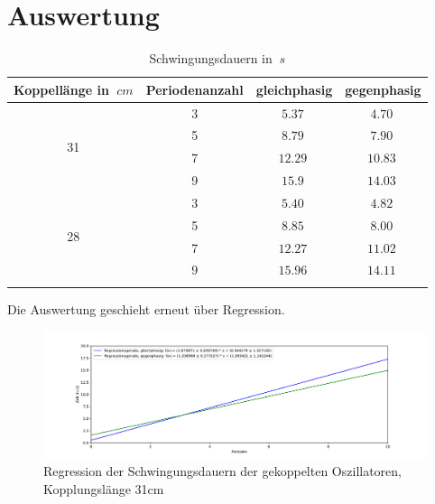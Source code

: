 \section{Auswertung}

\begin{table}[h!]
    \begin{center}
        \caption{Schwingungsdauern in $\SI{}{s}$}
        \begin{tabular}{cccc}
            \hline
            Koppellänge in $\SI{}{cm}$ & Periodenanzahl & gleichphasig   & gegenphasig    \\
            \hline
            \multirow{4}{*}{31}        & 3              & $\SI{5,37}{}$  & $\SI{4,70}{}$  \\
                                       & 5              & $\SI{8,79}{}$  & $\SI{7,90}{}$  \\
                                       & 7              & $\SI{12,29}{}$ & $\SI{10,83}{}$ \\
                                       & 9              & $\SI{15,9}{}$ & $\SI{14,03}{}$ \\
            \hline
            \multirow{4}{*}{28}        & 3              & $\SI{5,40}{}$  & $\SI{4,82}{}$  \\
                                       & 5              & $\SI{8,85}{}$  & $\SI{8,00}{}$  \\
                                       & 7              & $\SI{12,27}{}$ & $\SI{11,02}{}$ \\
                                       & 9              & $\SI{15,96}{}$ & $\SI{14,11}{}$ \\
            \hline
            \label{tab:Koppellaenge-Messwerte}
        \end{tabular}
    \end{center}
\end{table}

Die Auswertung geschieht erneut über Regression.

\begin{figure}[h!]{}
    \begin{center}
        \includegraphics[scale = 0.4]{./Pendel/Protokoll/fig/Koppelpendel_Regression_3.pdf}
        \caption{Regression der Schwingungsdauern der gekoppelten Oszillatoren,  Kopplungslänge 31cm}
        \label{fig:Schwingungsdauern-gekoppelte-Oszillatoren1}
    \end{center}
\end{figure}

